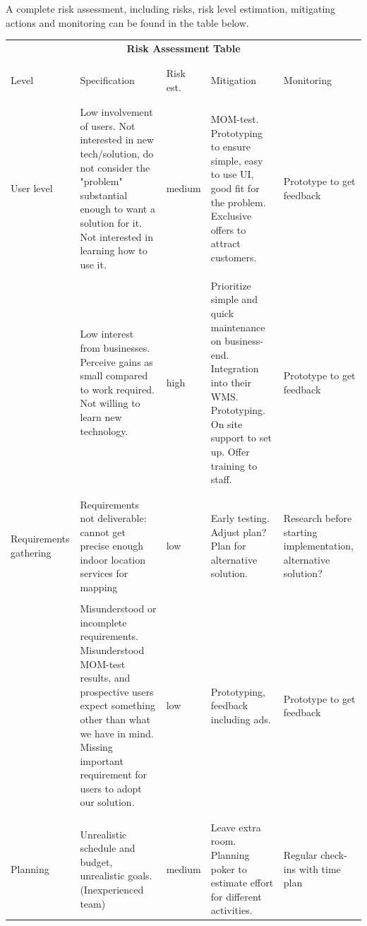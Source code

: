 \documentclass[titlepage]{article}
\begin{document}
A complete risk assessment, including risks, risk level estimation, mitigating actions and monitoring can be found in the table below.

\begin{center}
\footnotesize
\begin{longtable}{p{2.1cm}|p{3.5cm}p{1.2cm}p{3.5cm}p{1.7cm}}
\multicolumn{5}{c}{\bfseries Risk Assessment Table}\\
\\
\hline
\\
 Level & Specification & Risk est. & Mitigation & Monitoring \\
 \\
 \hline
 \\
User level & Low involvement of users. Not interested in new tech/solution, do not consider the "problem" substantial enough to want a solution for it. Not interested in learning how to use it. & medium & MOM-test. Prototyping to ensure simple, easy to use UI, good fit for the problem. Exclusive offers to attract customers. & Prototype to get feedback \\
\\
& Low interest from businesses. Perceive gains as small compared to work required. Not willing to learn new technology. & high & Prioritize simple and quick maintenance on business-end. Integration into their WMS. Prototyping. On site support to set up. Offer training to staff. & Prototype to get feedback \\  
\\
\hline
\\
Requirements gathering & Requirements not deliverable: cannot get precise enough indoor location services for mapping & low & Early testing. Adjust plan? Plan for alternative solution. & Research before starting implementation, alternative solution? \\
\\
& Misunderstood or incomplete requirements. Misunderstood MOM-test results, and prospective users expect something other than what we have in mind. Missing important requirement for users to adopt our solution. & low & Prototyping, feedback including ads. & Prototype to get feedback \\
\\
\hline
\\
Planning & Unrealistic schedule and budget, unrealistic goals. (Inexperienced team) & medium & Leave extra room. Planning poker to estimate effort for different activities. & Regular check-ins with time plan \\

\end{longtable}
\end{center}
\end{document}
